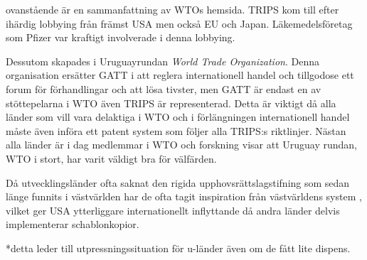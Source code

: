 ovanstående är en sammanfattning av WTOs hemsida\cite{wto}. TRIPS kom till efter ihärdig lobbying från främst USA\cite{drahos} men också EU och Japan. Läkemedelsföretag som Pfizer var kraftigt involverade i denna lobbying\cite{drahos}.


Dessutom skapades i Uruguayrundan \emph{World Trade Organization}. Denna organisation ersätter GATT i att reglera internationell handel och tillgodose ett forum för förhandlingar och att lösa tivster, men GATT är endast en av stöttepelarna i WTO även TRIPS är representerad. Detta är viktigt då alla länder som vill vara delaktiga i WTO och i förlängningen internationell handel måste även införa ett patent system som följer alla TRIPS:s riktlinjer. Nästan alla länder är i dag medlemmar i WTO och forskning visar att Uruguay rundan, WTO i stort, har varit väldigt bra för välfärden\cite{harrison}. 

Då utvecklingsländer ofta saknat den rigida upphovsrättslagstifning som sedan länge funnits i västvärlden har de ofta tagit inspiration från västvärldens system \cite{finger} , vilket ger USA ytterliggare internationellt inflyttande då andra länder delvis implementerar schablonkopior.

*detta leder till utpressningssituation för u-länder även om de fått lite dispens.